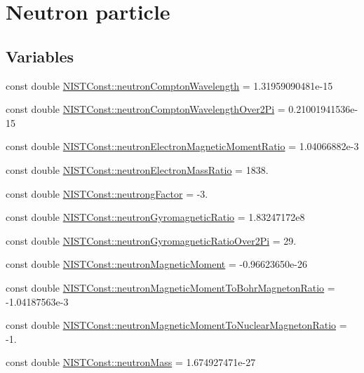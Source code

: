 \hypertarget{group___neutron}{}\section{Neutron particle}
\label{group___neutron}
\subsection*{Variables}
\begin{DoxyCompactItemize}
\item 
const double \hyperlink{group___neutron_ga769ac3bb36b199f820b5d2974d63f897}{N\+I\+S\+T\+Const\+::neutron\+Compton\+Wavelength} = 1.\+31959090481e-\/15
\item 
const double \hyperlink{group___neutron_ga296bbfcb4bd095c1167efa636898632c}{N\+I\+S\+T\+Const\+::neutron\+Compton\+Wavelength\+Over2\+Pi} = 0.\+21001941536e-\/15
\item 
const double \hyperlink{group___neutron_ga3aab0a26b37b5116b3861164274b599b}{N\+I\+S\+T\+Const\+::neutron\+Electron\+Magnetic\+Moment\+Ratio} = 1.\+04066882e-\/3
\item 
const double \hyperlink{group___neutron_gab348dce51150510468de9d4aa9dece17}{N\+I\+S\+T\+Const\+::neutron\+Electron\+Mass\+Ratio} = 1838.
\item 
const double \hyperlink{group___neutron_gac96a82ff7cb2cf20cb9cfe754756c08e}{N\+I\+S\+T\+Const\+::neutrong\+Factor} = -\/3.
\item 
const double \hyperlink{group___neutron_gaa36e892cf37340a9122574e4a957570d}{N\+I\+S\+T\+Const\+::neutron\+Gyromagnetic\+Ratio} = 1.\+83247172e8
\item 
const double \hyperlink{group___neutron_ga66ce4219c0fa9d7e9050e5bef3cb743c}{N\+I\+S\+T\+Const\+::neutron\+Gyromagnetic\+Ratio\+Over2\+Pi} = 29.
\item 
const double \hyperlink{group___neutron_ga42a101bcaf7105edbfd6c06de9633d22}{N\+I\+S\+T\+Const\+::neutron\+Magnetic\+Moment} = -\/0.\+96623650e-\/26
\item 
const double \hyperlink{group___neutron_ga01b6142f2d5dd4cd6ff10d2938a312cf}{N\+I\+S\+T\+Const\+::neutron\+Magnetic\+Moment\+To\+Bohr\+Magneton\+Ratio} = -\/1.\+04187563e-\/3
\item 
const double \hyperlink{group___neutron_ga6ee94c226124c9b64617ed473e78902a}{N\+I\+S\+T\+Const\+::neutron\+Magnetic\+Moment\+To\+Nuclear\+Magneton\+Ratio} = -\/1.
\item 
const double \hyperlink{group___neutron_ga74edcc04e59f152b2afa0fdba8683383}{N\+I\+S\+T\+Const\+::neutron\+Mass} = 1.\+674927471e-\/27

\end{DoxyCompactItemize}
